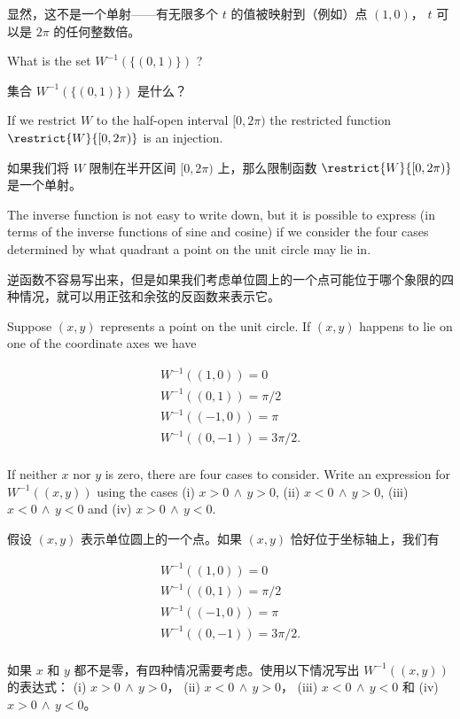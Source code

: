 显然，这不是一个单射——有无限多个 $t$ 的值被映射到（例如）点 $(1,0)$， $t$ 可以是 $2\pi$ 的任何整数倍。

\begin{exer}
What is the set $W^{-1}(\{(0,1)\})$ ?
\end{exer}

\begin{exer}
集合 $W^{-1}(\{(0,1)\})$ 是什么？
\end{exer}

If we restrict $W$ to the half-open interval $[0, 2\pi)$ the restricted
function $\restrict{W}{[0, 2\pi)}$ is an injection.

如果我们将 $W$ 限制在半开区间 $[0, 2\pi)$ 上，那么限制函数 $\restrict{W}{[0, 2\pi)}$ 是一个单射。

The inverse function is 
not easy to write down, but it is possible to express (in terms 
of the inverse functions of sine and cosine) if we consider the 
four cases determined by what quadrant a point on the unit circle 
may lie in.

逆函数不容易写出来，但是如果我们考虑单位圆上的一个点可能位于哪个象限的四种情况，就可以用正弦和余弦的反函数来表示它。

\begin{exer}
Suppose $(x,y)$ represents a point on the unit circle. If $(x,y)$ happens
to lie on one of the coordinate axes we have 

\begin{gather*}
W^{-1}((1,0)) = 0\\
W^{-1}((0,1)) = \pi/2\\
W^{-1}((-1,0)) = \pi\\
W^{-1}((0,-1)) = 3\pi/2.\\
\end{gather*}

If neither $x$ nor $y$ is zero, there are four cases to consider. Write an expression for $W^{-1}((x,y))$ using the cases 
(i) $x>0 \, \land \, y>0$, 
(ii) $x<0 \, \land \, y>0$, 
(iii) $x<0 \, \land \, y<0$ and  
(iv) $x>0 \, \land \, y<0$.
\end{exer}

\begin{exer}
假设 $(x,y)$ 表示单位圆上的一个点。如果 $(x,y)$ 恰好位于坐标轴上，我们有

\begin{gather*}
W^{-1}((1,0)) = 0\\
W^{-1}((0,1)) = \pi/2\\
W^{-1}((-1,0)) = \pi\\
W^{-1}((0,-1)) = 3\pi/2.\\
\end{gather*}

如果 $x$ 和 $y$ 都不是零，有四种情况需要考虑。使用以下情况写出 $W^{-1}((x,y))$ 的表达式：
(i) $x>0 \, \land \, y>0$， 
(ii) $x<0 \, \land \, y>0$， 
(iii) $x<0 \, \land \, y<0$ 和  
(iv) $x>0 \, \land \, y<0$。
\end{exer}

